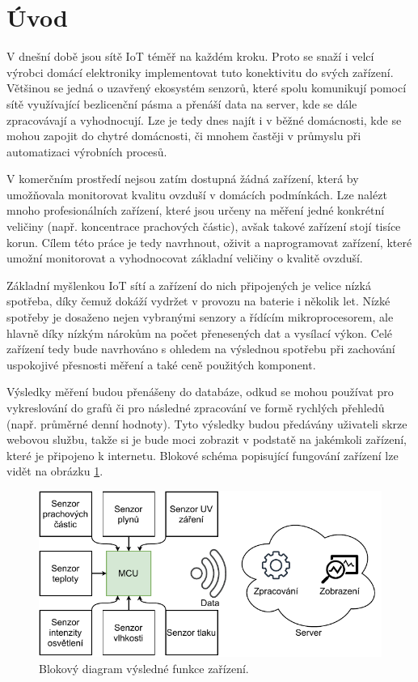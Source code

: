 \chapter*{Úvod}
{}

V dnešní době jsou sítě IoT téměř na každém kroku. Proto se snaží i velcí výrobci domácí elektroniky implementovat tuto konektivitu do svých zařízení. Většinou se jedná o uzavřený ekosystém senzorů, které spolu komunikují pomocí sítě využívající bezlicenční pásma a přenáší data na server, kde se dále zpracovávají a vyhodnocují. Lze je tedy dnes najít i v běžné domácnosti, kde se mohou zapojit do chytré domácnosti, či mnohem častěji v průmyslu při automatizaci výrobních procesů.

V komerčním prostředí nejsou zatím dostupná žádná zařízení, která by umožňovala monitorovat kvalitu ovzduší v domácích podmínkách. Lze nalézt mnoho profesionálních zařízení, které jsou určeny na měření jedné konkrétní veličiny (např. koncentrace prachových částic), avšak takové zařízení stojí tisíce korun. Cílem této práce je tedy navrhnout, oživit a naprogramovat zařízení, které umožní monitorovat a vyhodnocovat základní veličiny o kvalitě ovzduší.

Základní myšlenkou IoT sítí a zařízení do nich připojených je velice nízká spotřeba, díky čemuž dokáží vydržet v provozu na baterie i několik let. Nízké spotřeby je dosaženo nejen vybranými senzory a řídícím mikroprocesorem, ale hlavně díky nízkým nárokům na počet přenesených dat a vysílací výkon. Celé zařízení tedy bude navrhováno s ohledem na výslednou spotřebu při zachování uspokojivé přesnosti měření a také ceně použitých komponent.

Výsledky měření budou přenášeny do databáze, odkud se mohou používat pro vykreslování do grafů či pro následné zpracování ve formě rychlých přehledů (např. průměrné denní hodnoty). Tyto výsledky budou předávány uživateli skrze webovou službu, takže si je bude moci zobrazit v podstatě na jakémkoli zařízení, které je připojeno k internetu. Blokové schéma popisující fungování zařízení lze vidět na obrázku \ref{fig_BlockDiagram-blank}.

\begin{figure}[h]
    \centering
    \includegraphics{obrazky/block_schematic-blank.drawio.pdf}
    \caption{Blokový diagram výsledné funkce zařízení.}
    \label{fig_BlockDiagram-blank}
\end{figure}